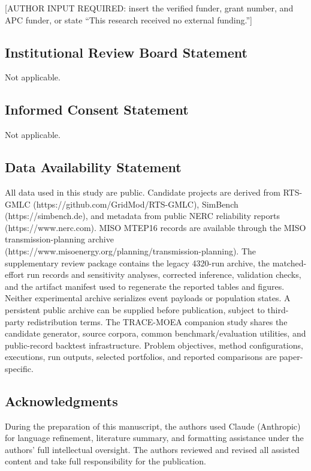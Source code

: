 \documentclass[
]{article}
\begin{document}
{[}AUTHOR INPUT REQUIRED: insert the verified funder, grant number, and APC funder, or state ``This research received no external funding.''{]}

\subsection{Institutional Review Board Statement}\label{institutional-review-board-statement}

Not applicable.

\subsection{Informed Consent Statement}\label{informed-consent-statement}

Not applicable.

\subsection{Data Availability Statement}\label{data-availability-statement}

All data used in this study are public. Candidate projects are derived from RTS-GMLC (https://github.com/GridMod/RTS-GMLC), SimBench (https://simbench.de), and metadata from public NERC reliability reports (https://www.nerc.com). MISO MTEP16 records are available through the MISO transmission-planning archive (https://www.misoenergy.org/planning/transmission-planning). The supplementary review package contains the legacy 4320-run archive, the matched-effort run records and sensitivity analyses, corrected inference, validation checks, and the artifact manifest used to regenerate the reported tables and figures. Neither experimental archive serializes event payloads or population states. A persistent public archive can be supplied before publication, subject to third-party redistribution terms. The TRACE-MOEA companion study shares the candidate generator, source corpora, common benchmark/evaluation utilities, and public-record backtest infrastructure. Problem objectives, method configurations, executions, run outputs, selected portfolios, and reported comparisons are paper-specific.

\subsection{Acknowledgments}\label{acknowledgments}

During the preparation of this manuscript, the authors used Claude (Anthropic) for language refinement, literature summary, and formatting assistance under the authors' full intellectual oversight. The authors reviewed and revised all assisted content and take full responsibility for the publication.
\end{document}

